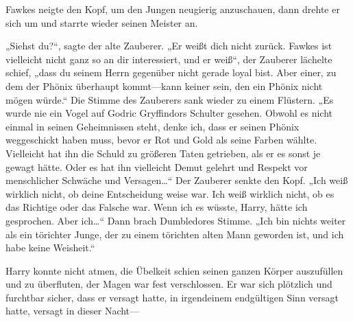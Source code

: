 Fawkes neigte den Kopf, um den Jungen neugierig anzuschauen, dann drehte er sich um und starrte wieder seinen Meister an.

„Siehst du?“, sagte der alte Zauberer. „Er weißt dich nicht zurück. Fawkes ist vielleicht nicht ganz so an dir interessiert, und er weiß“, der Zauberer lächelte schief, „dass du seinem Herrn gegenüber nicht gerade loyal bist. Aber einer, zu dem der Phönix überhaupt kommt—kann keiner sein, den ein Phönix nicht mögen würde.“
Die Stimme des Zauberers sank wieder zu einem Flüstern.
„Es wurde nie ein Vogel auf Godric Gryffindors Schulter gesehen. Obwohl es nicht einmal in seinen Geheimnissen steht, denke ich, dass er seinen Phönix weggeschickt haben muss, bevor er Rot und Gold als seine Farben wählte. Vielleicht hat ihn die Schuld zu größeren Taten getrieben, als er es sonst je gewagt hätte. Oder es hat ihn vielleicht Demut gelehrt und Respekt vor menschlicher Schwäche und Versagen…“ Der Zauberer senkte den Kopf.
„Ich weiß wirklich nicht, ob deine Entscheidung weise war. Ich weiß wirklich nicht, ob es das Richtige oder das Falsche war. Wenn ich es wüsste, Harry, hätte ich gesprochen. Aber ich…“ Dann brach Dumbledores Stimme. „Ich bin nichts weiter als ein törichter Junge, der zu einem törichten alten Mann geworden ist, und ich habe keine Weisheit.“

Harry konnte nicht atmen, die Übelkeit schien seinen ganzen Körper auszufüllen und zu überfluten, der Magen war fest verschlossen. Er war sich plötzlich und furchtbar sicher, dass er versagt hatte, in irgendeinem endgültigen Sinn versagt hatte, versagt in dieser Nacht—

